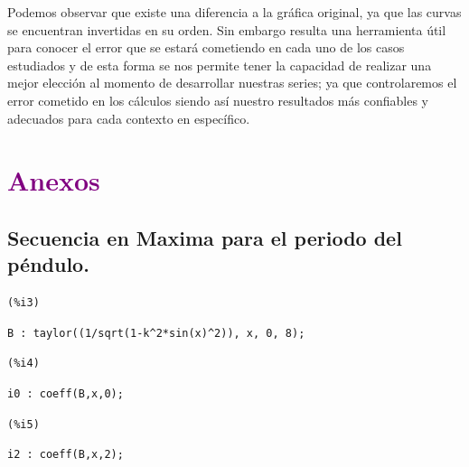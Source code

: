 \documentclass[12pt]{article}
\begin{document}
Podemos observar que existe una diferencia a la gráfica original, ya que las curvas se encuentran invertidas en su orden. Sin embargo resulta una herramienta útil para conocer el error que se estará cometiendo en cada uno de los casos estudiados y de esta forma se nos permite tener la capacidad de realizar una mejor elección al momento de desarrollar nuestras series; ya que controlaremos el error cometido en los cálculos siendo así nuestro resultados más confiables y adecuados para cada contexto en específico.






\pagebreak







\section*{\textcolor{Purple}{Anexos}}
\subsection*{\textcolor{RubineRed}{Secuencia en Maxima para el periodo del péndulo.}}

\noindent
\begin{minipage}[t]{8ex}{\color{red}\bf
\begin{verbatim}
(%i3) 
\end{verbatim}}
\end{minipage}
\begin{minipage}[t]{\textwidth}{\color{blue}
\begin{verbatim}
B : taylor((1/sqrt(1-k^2*sin(x)^2)), x, 0, 8);
\end{verbatim}}
\end{minipage}

\noindent
\begin{minipage}[t]{8ex}{\color{red}\bf
\begin{verbatim}
(%i4) 
\end{verbatim}}
\end{minipage}
\begin{minipage}[t]{\textwidth}{\color{blue}
\begin{verbatim}
i0 : coeff(B,x,0);
\end{verbatim}}
\end{minipage}

\noindent
\begin{minipage}[t]{8ex}{\color{red}\bf
\begin{verbatim}
(%i5) 
\end{verbatim}}
\end{minipage}
\begin{minipage}[t]{\textwidth}{\color{blue}
\begin{verbatim}
i2 : coeff(B,x,2);
\end{verbatim}}
\end{minipage}
\end{document}
